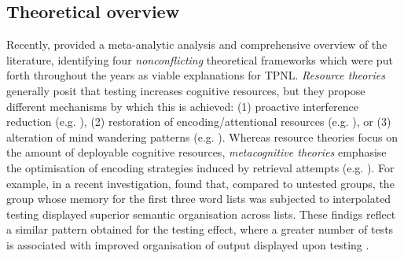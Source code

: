 \documentclass[../main.tex]{subfiles}
\begin{document}
\hypertarget{theory}{%
\subsection{Theoretical overview}}

Recently, \cite{chanRetrievalPotentiatesNew2018} provided a meta-analytic analysis and comprehensive overview of the literature, identifying four \textit{nonconflicting} theoretical frameworks which were put forth throughout the years as viable explanations for TPNL. \textit{Resource theories} generally posit that testing increases cognitive resources, but they propose different mechanisms by which this is achieved: (1) proactive interference reduction (e.g. \citealp{wahlheimTestingCanCounteract2015, weinsteinTestingProtectsProactive2011, szpunarTestingStudyInsulates2008, nunesTestingImprovesTrue2012}), (2) restoration of encoding/attentional resources (e.g. \citealp{pastotterRetrievalLearningFacilitates2011}), or (3) alteration of mind wandering patterns (e.g. \citealp{jingInterpolatedTestingInfluences2016,szpunarInterpolatedMemoryTests2013,szpunarMindWanderingEducation2013}). Whereas resource theories focus on the amount of deployable cognitive resources, \textit{metacognitive theories} emphasise the optimisation of encoding strategies induced by retrieval attempts (e.g. \citealp{choTestingEnhancesBoth2017, chanTestingPotentiatesNew2018}). For example, in a recent investigation, \cite{chanTestingPotentiatesNew2018} found that, compared to untested groups, the group whose memory for the first three word lists was subjected to interpolated testing displayed superior semantic organisation across lists. These findigs reflect a similar pattern obtained for the testing effect, where a greater number of tests is associated with improved organisation of output displayed upon testing \citep{karpickeRetrievalBasedLearningActive2012,zarombTestingEffectFree2010}.
\end{document}
